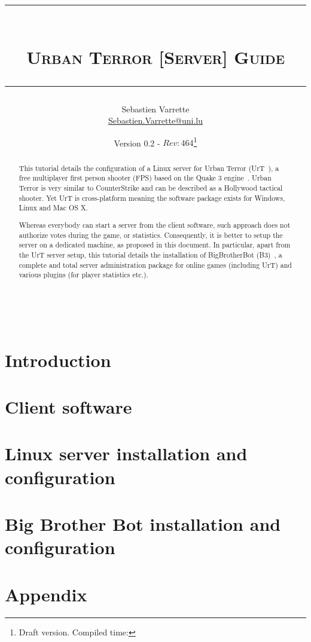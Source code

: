 \documentclass[11pt,twoside,a4paper]{article}
\title{
  {\rule{\textwidth}{1mm}}\\[1em]
  \textsc{Urban Terror [Server] Guide}\\[0.75em]
  {\rule{\textwidth}{1mm}}  
}
\author{Sebastien Varrette\\ {\small \url{Sebastien.Varrette@uni.lu}}}
\date{Version 0.2 - $Rev: 464 $\thanks{Draft version. Compiled time: \isodayandtime}}
\begin{document}
\maketitle

\begin{abstract}
  This tutorial details the configuration of a Linux server for Urban Terror
  (UrT~\cite{urt}), a free multiplayer first person shooter (FPS) based on the
  Quake 3 engine~\cite{ioq3}.  Urban Terror is very similar to CounterStrike and
  can be described as a Hollywood tactical shooter. Yet UrT is cross-platform
  meaning the software package exists for Windows, Linux and Mac OS X.

  Whereas everybody can start a server from the client software, such approach
  does not authorize votes during the game, or statistics.  Consequently, it is
  better to setup the server on a dedicated machine, as proposed in this document.
  In particular, apart from the UrT server setup, this tutorial details the
  installation of BigBrotherBot (B3)~\cite{b3}, a complete and total server
  administration package for online games (including UrT) and various plugins (for
  player statistics etc.).
\end{abstract}

\clearpage
~\vfill

\clearpage

\tableofcontents
\clearpage


\section{Introduction}
\label{sec:intro}



\section{Client software}
\label{sec:urt_client}



\section{Linux server installation and configuration}
\label{sec:urt_server}


\section{Big Brother Bot installation and configuration}
\label{sec:b3}



\clearpage
\appendix

\section{Appendix}
\label{sec:anx}




\end{document}
